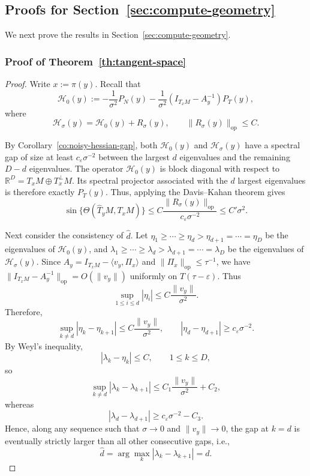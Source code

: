 \documentclass[11pt]{article}
\theoremstyle{plain}
\theoremstyle{definition}
\begin{document}
\subsection{Proofs for Section~\ref{sec:compute-geometry}}\label{sec:pf-geometry}
We next prove the results in Section~\ref{sec:compute-geometry}.
\subsubsection{Proof of Theorem~\ref{th:tangent-space}}\label{sec:pf-tangent-space}
\begin{proof}
Write $x:=\pi(y)$. Recall that
\[
\mathcal H_0(y):=
-\frac1{\sigma^2}P_N(y)
-\frac1{\sigma^2}(I_{T_xM}-A_y^{-1})P_T(y),
\]
where
\[
\mathcal H_\sigma(y)=\mathcal H_0(y)+R_\sigma(y),
\qquad
\|R_\sigma(y)\|_{\mathrm{op}}\le C.
\]

By Corollary~\ref{co:noisy-hessian-gap}, both $\mathcal H_0(y)$ and $\mathcal H_\sigma(y)$ have a spectral gap of size at least $c_\varepsilon \sigma^{-2}$ between the largest $d$ eigenvalues and the remaining $D-d$ eigenvalues.
The operator $\mathcal H_0(y)$ is block diagonal with respect to $\mathbb R^D=T_xM\oplus T_x^\perp M$. Its spectral projector associated with the $d$ largest eigenvalues is therefore exactly $P_T(y)$.
Thus, applying the Davis--Kahan theorem gives
\[
\sin\{\Theta(\widehat T_yM, T_xM)\} 
\le
C\frac{\|R_\sigma(y)\|_{\mathrm{op}}}{c_\varepsilon \sigma^{-2}}
\le C' \sigma^2.
\]

Next consider the consistency of $\widehat d$. Let $\eta_1\ge\cdots\ge \eta_d>\eta_{d+1}=\cdots = \eta_D$ be the eigenvalues of $\mathcal H_0(y)$, and $\lambda_1\ge\cdots\ge \lambda_d>\lambda_{d+1}=\cdots = \lambda_D$ be the eigenvalues of $\mathcal H_\sigma(y)$.
Since $A_y=I_{T_xM}-\langle v_y,\Pi_{x}\rangle$ and $\|\Pi_{x}\|_{\mathrm{op}}\le \tau^{-1}$, we have $\|I_{T_xM} - A_y^{-1}\|_{\mathrm{op}}=O(\|v_y\|)$ uniformly on $T(\tau-\varepsilon)$. Thus
\[
\sup_{1\le i\le d}|\eta_i|
\le C\frac{\|v_y\|}{\sigma^2}.
\]
Therefore,
\[
\sup_{k\neq d} |\eta_k-\eta_{k+1}|
\le C\frac{\|v_y\|}{\sigma^2},
\qquad
|\eta_d-\eta_{d+1}|
\ge c_\varepsilon \sigma^{-2}.
\]
By Weyl's inequality,
\[
|\lambda_k-\eta_k|\le C,
\qquad 1\le k\le D,
\]
so
\[
\sup_{k\neq d} |\lambda_k-\lambda_{k+1}|
\le C_1\frac{\|v_y\|}{\sigma^2}+C_2,
\]
whereas
\[
|\lambda_d-\lambda_{d+1}|
\ge c_\varepsilon \sigma^{-2}-C_3.
\]
Hence, along any sequence such that $\sigma\to0$ and $\|v_y\|\to0$, the gap at $k=d$ is eventually strictly larger than all other consecutive gaps, i.e.,
\[
\widehat d
= \arg\max_{k}|\lambda_k-\lambda_{k+1}| = d.
\]
\end{proof}
\end{document}
